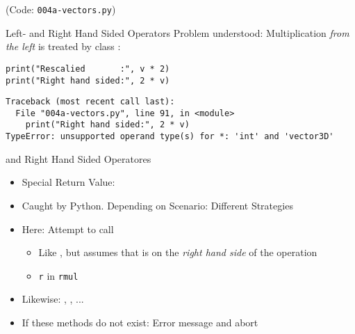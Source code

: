 
\begin{frame}
%
\begin{center}
	(Code: \texttt{004a-vectors.py})
\end{center}
%
\end{frame}


\begin{frame}[fragile]{Left- and Right Hand Sided Operators}
%
Problem understood: Multiplication \emph{from the left} is treated by class :
\begin{warnbox}[Example: Right Hand Sided Multiplication, leftupper=6mm]
\begin{verbatim}
print("Rescalied       :", v * 2)
print("Right hand sided:", 2 * v)
\end{verbatim}
\end{warnbox}
%
\begin{cmdbox}
\begin{verbatim}
Traceback (most recent call last):
  File "004a-vectors.py", line 91, in <module>
    print("Right hand sided:", 2 * v)
TypeError: unsupported operand type(s) for *: 'int' and 'vector3D'
\end{verbatim}
\end{cmdbox}
%
\end{frame}


\begin{frame}[fragile]{ and Right Hand Sided Operatores}
%
\begin{itemize}
\item Special Return Value: 
\item Caught by Python. Depending on Scenario: Different Strategies
\item Here: Attempt to call 
	\begin{itemize}
	\item Like , but assumes that  is on the \emph{right hand side} of the operation
	\item[\Thus] \texttt{r} in \texttt{rmul}
	\end{itemize}
\item Likewise: , , ...
\item If these methods do not exist: Error message and abort
\end{itemize}
%
\end{frame}


